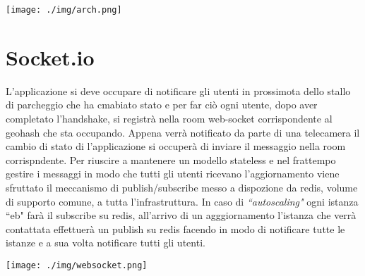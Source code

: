\centerline{\texttt{[image: ./img/arch.png]}}

\section{Socket.io}
L'applicazione si deve occupare di notificare gli utenti in prossimota dello stallo di parcheggio che ha cmabiato stato e per far ciò ogni utente, dopo aver completato l'handshake, si registrà nella room web-socket corrispondente al geohash che sta occupando. Appena verrà notificato da parte di una telecamera il cambio di stato di l'applicazione si occuperà di inviare il messaggio nella room corrispndente. Per riuscire a mantenere un modello stateless e nel frattempo gestire i messaggi in modo che tutti gli utenti ricevano l'aggiornamento viene sfruttato il meccanismo di publish/subscribe messo a dispozione da redis, volume di supporto comune, a tutta l'infrastruttura. In caso di \textit{``autoscaling"} ogni istanza ``eb" farà il subscribe su redis, all'arrivo di un agggiornamento l'istanza che verrà contattata effettuerà un publish su redis facendo in modo di notificare tutte le istanze e a sua volta notificare tutti gli utenti.

\vspace{0.5truecm}

\centerline{\texttt{[image: ./img/websocket.png]}}



